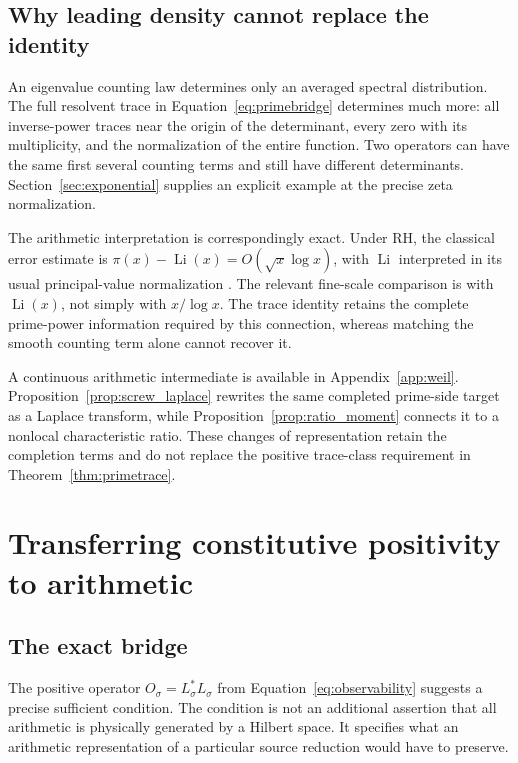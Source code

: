 \documentclass[11pt,letterpaper]{article}
\numberwithin{equation}{section}
\theoremstyle{definition}
\theoremstyle{remark}
\DeclareMathOperator{\Li}{Li}
\begin{document}
\subsection{Why leading density cannot replace the identity}
An eigenvalue counting law determines only an averaged spectral distribution. The full resolvent trace in Equation~\eqref{eq:primebridge} determines much more: all inverse-power traces near the origin of the determinant, every zero with its multiplicity, and the normalization of the entire function. Two operators can have the same first several counting terms and still have different determinants. Section~\ref{sec:exponential} supplies an explicit example at the precise zeta normalization.

The arithmetic interpretation is correspondingly exact. Under RH, the classical error estimate is $\pi(x)-\Li(x)=O(\sqrt{x}\log x)$, with $\Li$ interpreted in its usual principal-value normalization \cite{bombieri}. The relevant fine-scale comparison is with $\Li(x)$, not simply with $x/\log x$. The trace identity retains the complete prime-power information required by this connection, whereas matching the smooth counting term alone cannot recover it.

A continuous arithmetic intermediate is available in Appendix~\ref{app:weil}. Proposition~\ref{prop:screw_laplace} rewrites the same completed prime-side target as a Laplace transform, while Proposition~\ref{prop:ratio_moment} connects it to a nonlocal characteristic ratio. These changes of representation retain the completion terms and do not replace the positive trace-class requirement in Theorem~\ref{thm:primetrace}.

\section{Transferring constitutive positivity to arithmetic}
\label{sec:gram}
\subsection{The exact bridge}
The positive operator $O_\sigma=L_\sigma^*L_\sigma$ from Equation~\eqref{eq:observability} suggests a precise sufficient condition. The condition is not an additional assertion that all arithmetic is physically generated by a Hilbert space. It specifies what an arithmetic representation of a particular source reduction would have to preserve.
\end{document}
